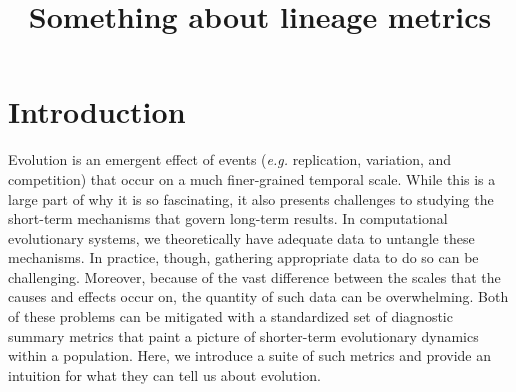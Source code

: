 \documentclass[letterpaper]{article}
\title{Something about lineage metrics}
\begin{document}
\maketitle

\begin{abstract}

\end{abstract}

\section{Introduction}

Evolution is an emergent effect of events (\textit{e.g.} replication, variation, and competition) that occur on a much finer-grained temporal scale. While this is a large part of why it is so fascinating, it also presents challenges to studying the short-term mechanisms that govern long-term results. In computational evolutionary systems, we theoretically have adequate data to untangle these mechanisms. In practice, though, gathering appropriate data to do so can be challenging. Moreover, because of the vast difference between the scales that the causes and effects occur on, the quantity of such data can be overwhelming. Both of these problems can be mitigated with a standardized set of diagnostic summary metrics that paint a picture of shorter-term evolutionary dynamics within a population. Here, we  introduce a suite of such metrics and provide an intuition for what they can tell us about evolution.





\end{document}
